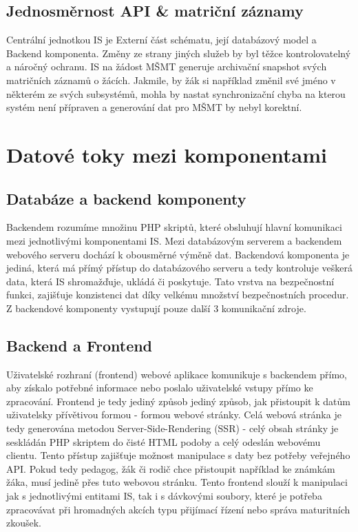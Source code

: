 \documentclass[FM,Proj]{tulthesis}
\begin{document}
\subsection*{Jednosměrnost API \& matriční záznamy}  
\label{section:jednosmernost-api-a-matricni-zaznamy}
Centrální jednotkou IS je Externí část schématu, její databázový model a Backend komponenta. Změny ze strany 
jiných služeb by byl těžce kontrolovatelný a náročný ochranu. IS na žádost MŠMT generuje archivační snapshot
svých matričních záznamů o žácích. Jakmile, by žák si například změnil své jméno v některém ze svých subsystémů,
mohla by nastat synchronizační chyba na kterou systém není přípraven a generování dat pro MŠMT by nebyl korektní.

\section{Datové toky mezi komponentami}
\label{section:datove-toky-mezi-komponentami}
\subsection*{Databáze a backend komponenty}
Backendem rozumíme množinu PHP skriptů, které obsluhují hlavní komunikaci mezi 
jednotlivými komponentami IS.
Mezi databázovým serverem a backendem webového serveru dochází k obousměrné výměně
dat. Backendová komponenta je jediná, která má přímý přístup do databázového serveru
a tedy kontroluje veškerá data, která IS shromažďuje, ukládá či poskytuje. Tato
vrstva na bezpečnostní funkci, zajišťuje konzistenci dat díky velkému množství
bezpečnostních procedur. Z backendové komponenty vystupují pouze další 3 komunikační
zdroje.

\subsection{Backend a Frontend}
\label{section:backend-a-frontend}
Uživatelské rozhraní (frontend) webové aplikace komunikuje s backendem přímo, aby získalo
potřebné informace nebo poslalo uživatelské vstupy přímo ke zpracování. Frontend je
tedy jediný způsob jediný způsob, jak přistoupit k datům uživatelsky přívětivou 
formou - formou webové stránky. Celá webová stránka je tedy generována metodou 
Server-Side-Rendering (SSR) - celý obsah stránky je seskládán
PHP skriptem do čisté HTML podoby a celý odeslán webovému clientu. Tento přístup zajišťuje
možnost manipulace s daty bez potřeby veřejného API. Pokud tedy pedagog, žák či 
rodič chce přistoupit například ke známkám žáka, musí jedině přes tuto webovou stránku.
Tento frontend slouží k manipulaci jak s jednotlivými entitami IS, tak i s dávkovými soubory,
které je potřeba zpracovávat při hromadných akcích typu přijímací řízení nebo správa 
maturitních zkoušek.
\end{document}
